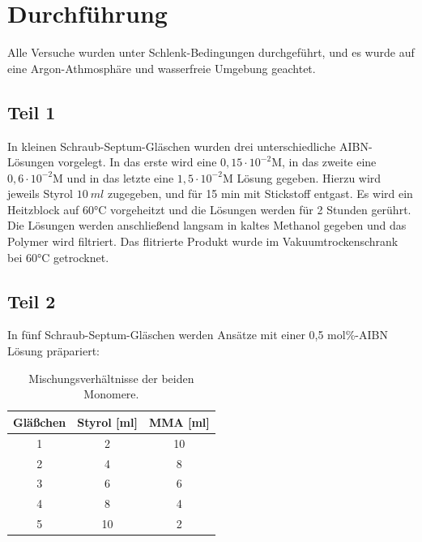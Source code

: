 \documentclass[10pt,a4paper,ngerman]{scrartcl}
\begin{document}
\section{Durchführung}

		Alle Versuche wurden unter Schlenk-Bedingungen durchgeführt, und es wurde auf eine Argon-Athmosphäre und wasserfreie Umgebung geachtet.\\

	\subsection{Teil 1}

		In kleinen Schraub-Septum-Gläschen wurden drei unterschiedliche AIBN-Lösungen vorgelegt. 
		In das erste wird eine $0,15\cdot 10^{-2}\text{M}$, in das zweite eine $0,6\cdot 10^{-2}\text{M}$ und in das letzte eine $1,5\cdot 10^{-2}\text{M}$ Lösung gegeben. 
		Hierzu wird jeweils Styrol $\SI{10}{ml}$ zugegeben, und für 15 min mit Stickstoff entgast. 
		Es wird ein Heitzblock auf 60°C vorgeheitzt und die Lösungen werden für 2 Stunden gerührt.
		Die Lösungen werden anschließend langsam in kaltes Methanol gegeben und das Polymer wird filtriert.
		Das flitrierte Produkt wurde im Vakuumtrockenschrank bei 60°C getrocknet.

	\subsection{Teil 2}

		In fünf Schraub-Septum-Gläschen werden Ansätze mit einer 0,5 mol\%-AIBN Lösung präpariert:

		\begin{table}[htbp]
			\centering
			\caption{Mischungsverhältnisse der beiden Monomere.}
			\label{mischungsverhaeltnisse}
			\begin{tabular}{c|c|c}
					Gläßchen & \textbf{Styrol [ml]} & \textbf{MMA [ml]} \\
					\hline 
					1 & 2                    & 10                \\ 
					2 & 4					 & 8				 \\
					3 & 6                    & 6                 \\ 
					4 & 8                    & 4                 \\ 
					5 & 10                   & 2                 \\ 
			\end{tabular}
		\end{table}
	
\end{document}
